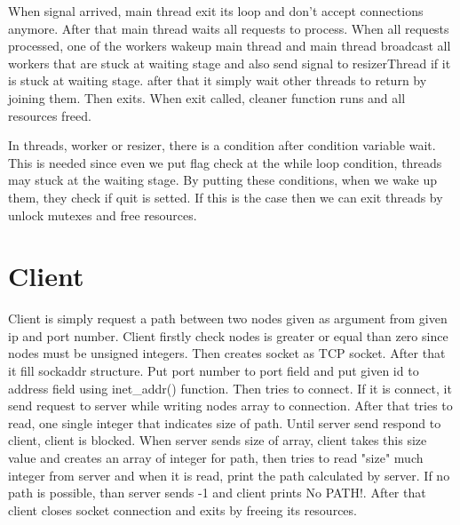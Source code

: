 \documentclass[letterpaper, 10 pt, conference]{ieeeconf}  %
\begin{document}
When signal arrived, main thread exit its loop and don't accept connections anymore. After that main thread waits all requests to process. When all requests processed, one of the workers wakeup main thread and main thread broadcast all workers that are stuck at waiting stage and also send signal to resizerThread if it is stuck at waiting stage. after that it simply wait other threads to return by joining them. Then exits. When exit called, cleaner function runs and all resources freed.

In threads, worker or resizer, there is a condition after condition variable wait. This is needed since even we put flag check at the while loop condition, threads may stuck at the waiting stage. By putting these conditions, when we wake up them, they check if quit is setted. If this is the case then we can exit threads by unlock mutexes and free resources.

\section{Client}
Client is simply request a path between two nodes given as argument from given ip and port number. Client firstly check nodes is greater or equal than zero since nodes must be unsigned integers. Then creates socket as TCP socket. After that it fill sockaddr structure. Put port number to port field and put given id to address field using inet\_addr() function. Then tries to connect. If it is connect, it send request to server while writing nodes array to connection. After that tries to read, one single integer that indicates size of path. Until server send respond to client, client is blocked. When server sends size of array, client takes this size value and creates an array of integer for path, then tries to read "size" much integer from server and when it is read, print the path calculated by server. If no path is possible, than server sends -1 and client prints No PATH!. After that client closes socket connection and exits by freeing its resources. 



\addtolength{\textheight}{-12cm}   %







\end{document}

